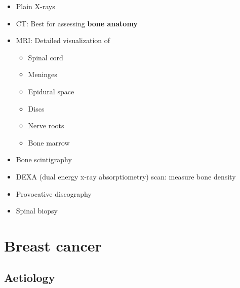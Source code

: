 \documentclass[
  12pt,
]{memoir}
\providecommand{\tightlist}{%
  \setlength{\itemsep}{0pt}\setlength{\parskip}{0pt}}
\begin{document}
\begin{itemize}
\tightlist
\item
  Plain X-rays
\item
  CT: Best for assessing \textbf{bone anatomy}
\item
  MRI: Detailed visualization of

  \begin{itemize}
  \tightlist
  \item
    Spinal cord
  \item
    Meninges
  \item
    Epidural space
  \item
    Discs
  \item
    Nerve roots
  \item
    Bone marrow
  \end{itemize}
\item
  Bone scintigraphy
\item
  DEXA (dual energy x-ray absorptiometry) scan: measure bone density
\item
  Provocative discography
\item
  Spinal biopsy
\end{itemize}

\pagebreak

\hypertarget{breast-cancer}{%
\chapter{Breast cancer}\label{breast-cancer}}

\hypertarget{aetiology}{%
\section{Aetiology}\label{aetiology}}
\end{document}
